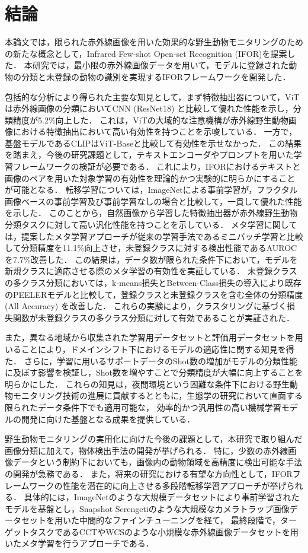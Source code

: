 
\chapter{結論}

本論文では，限られた赤外線画像を用いた効果的な野生動物モニタリングのための新たな概念として，Infrared Few-shot Open-set Recognition (IFOR)を提案した．
本研究では，最小限の赤外線画像データを用いて，モデルに登録された動物の分類と未登録の動物の識別を実現するIFORフレームワークを開発した．

包括的な分析により得られた主要な知見として，まず特徴抽出器について，ViTは赤外線画像の分類においてCNN (ResNet18) と比較して優れた性能を示し，分類精度が5.2\%向上した．
これは，ViTの大域的な注意機構が赤外線野生動物画像における特徴抽出において高い有効性を持つことを示唆している．
一方で，基盤モデルであるCLIPはViT-Baseと比較して有効性を示せなかった．
この結果を踏まえ，今後の研究課題として，テキストエンコーダやプロンプトを用いた学習フレームワークの検証が必要である．
これにより，IFORにおけるテキストと画像のペアを用いた対象学習の有効性を理論的かつ実験的に明らかにすることが可能となる．
転移学習については，ImageNetによる事前学習が，フラクタル画像ベースの事前学習及び事前学習なしの場合と比較して，一貫して優れた性能を示した．
このことから，自然画像から学習した特徴抽出器が赤外線野生動物分類タスクに対して高い汎化性能を持つことを示している．
メタ学習に関しては，提案したメタ学習アプローチが従来の学習手法であるミニバッチ学習と比較して分類精度を11.1\%向上させ，未登録クラスに対する検出性能であるAUROCを7.7\%改善した．
この結果は，データ数が限られた条件下において，モデルを新規クラスに適応させる際のメタ学習の有効性を実証している．
未登録クラスの多クラス分類においては，k-means損失とBetween-Class損失の導入により既存のPEELERモデルと比較して，登録クラスと未登録クラスを含む全体の分類精度 (All Accuracy) を改善した．
これらの実験により，クラスタリングに基づく損失関数が未登録クラスの多クラス分類に対して有効であることが実証された．

また，異なる地域から収集された学習用データセットと評価用データセットを用いることにより，ドメインシフト下におけるモデルの適応性に関する知見を得た．
さらに，学習に用いるサポートデータのShot数の増加がモデルの分類性能に及ぼす影響を検証し，Shot数を増やすことで分類精度が大幅に向上することを明らかにした．
これらの知見は，夜間環境という困難な条件下における野生動物モニタリング技術の進展に貢献するとともに，生態学の研究において直面する限られたデータ条件下でも適用可能な，
効率的かつ汎用性の高い機械学習モデルの開発に向けた基盤となる成果を提供している．

野生動物モニタリングの実用化に向けた今後の課題として，本研究で取り組んだ画像分類に加えて，物体検出手法の開発が挙げられる．
特に，少数の赤外線画像データという制約下においても，画像内の動物領域を高精度に検出可能な手法の開発が急務である．
また，将来の研究における有望な方向性として，IFORフレームワークの性能を潜在的に向上させる多段階転移学習アプローチが挙げられる．
具体的には，ImageNetのような大規模データセットにより事前学習されたモデルを基盤とし，Snapshot Serengetiのような大規模なカメラトラップ画像データセットを用いた中間的なファインチューニングを経て，
最終段階で，ターゲットタスクであるCCTやWCSのような小規模な赤外線画像データセットを用いたメタ学習を行うアプローチである．